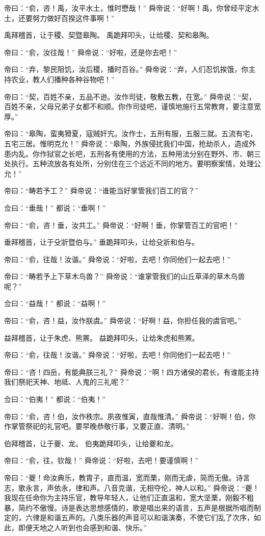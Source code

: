 \documentclass[a4paper,12pt,UTF8,twoside]{ctexbook}
\begin{document}
帝曰：“俞，咨！禹，汝平水土，惟时懋哉！”
舜帝说：“好啊！禹，你曾经平定水土，还要努力做好百揆这件事啊！”

禹拜稽首，让于稷、契暨皋陶。
禹跪拜叩头，让给稷、契和皋陶。

帝曰：“俞，汝往哉！”
舜帝说：“好啦，还是你去吧！”

帝曰：“弃，黎民阻饥，汝后稷，播时百谷。”
舜帝说：“弃，人们忍饥挨饿，你主持农业，教人们播种各种谷物吧！”

帝曰：“契，百姓不亲，五品不逊。汝作司徒，敬敷五教，在宽。”
舜帝说：“契，百姓不亲，父母兄弟子女都不和顺。你作司徒吧，谨慎地施行五常教育，要注意宽厚。”

帝曰：“皋陶，蛮夷猾夏，寇贼奸宄。汝作士，五刑有服，五服三就。五流有宅，五宅三居。惟明克允！”
舜帝说：“皋陶，外族侵扰我们中国，抢劫杀人，造成外患内乱。你作狱官之长吧，五刑各有使用的方法，五种用法分别在野外、市、朝三处执行。五种流放各有处所，分别住在三个远近不同的地方。要明察案情，处理公允！”

帝曰：“畴若予工？”
舜帝说：“谁能当好掌管我们百工的官？”

佥曰：“垂哉！”
都说：“垂啊！”

帝曰：“俞，咨！垂，汝共工。”
舜帝说：“好啊！垂，你掌管百工的官吧！”

垂拜稽首，让于殳斨暨伯与。”
垂跪拜叩头，让给殳斨和伯与。

帝曰：“俞，往哉！汝谐。”
舜帝说：“好啦，去吧！你同他们一起去吧！”

帝曰：“畴若予上下草木鸟兽？”
舜帝说：“谁掌管我们的山丘草泽的草木鸟兽呢？”

佥曰：“益哉！”
都说：“益啊！”

帝曰：“俞，咨！益，汝作朕虞。”
舜帝说：“好啊！益，你担任我的虞官吧。”

益拜稽首，让于朱虎、熊罴。
益跪拜叩头，让给朱虎和熊罴。

帝曰：“俞，往哉！汝谐。”
舜帝说：“好啦，去吧！你同他们一起去吧！”

帝曰：“咨！四岳，有能典朕三礼？”
舜帝说：“啊！四方诸侯的君长，有谁能主持我们祭祀天神、地祗、人鬼的三礼呢？”

佥曰：“伯夷！”
都说：“伯夷！”

帝曰：“俞，咨！伯，汝作秩宗。夙夜惟寅，直哉惟清。”
舜帝说：“好啊！伯，你作掌管祭祀的礼官吧。要早晚恭敬行事，又要正直、清明。”

伯拜稽首，让于夔、龙。
伯夷跪拜叩头，让给夔和龙。

帝曰：“俞，往，钦哉！”
舜帝说：“好啦，去吧！要谨慎啊！”

帝曰：“夔！命汝典乐，教胄子，直而温，宽而栗，刚而无虐，简而无傲。诗言志，歌永言，声依永，律和声。八音克谐，无相夺伦，神人以和。”
舜帝说：“夔！我现在任命你为主持乐官，教导年轻人，让他们正直温和，宽大坚栗，刚毅不粗暴，简约不傲慢。诗是表达思想感情的，歌是唱出来的语言，五声是根据所唱而制定的，六律是和谐五声的。八类乐器的声音可以和谐演奏，不使它们乱了次序，如此，即便天地之人听到也会感到和谐、快乐。”
\end{document}
